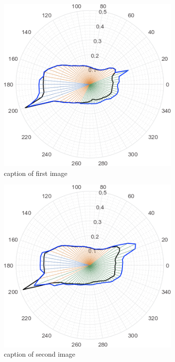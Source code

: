 \begin{figure}
     \centering
    \begin{subfigure}[t]{0.49\textwidth}
     \centering
        \includegraphics[width=0.8\linewidth]{STYLESTUFF/round00.png}
        \caption{caption of first image}
    \end{subfigure}
    \begin{subfigure}[t]{0.49\textwidth}
     \centering
       \includegraphics[width=0.8\linewidth]{STYLESTUFF/round01.png}
        \caption{caption of second image}
    \end{subfigure}
    \par\bigskip
   \begin{subfigure}[t]{0.49\textwidth}

\end{subfigure}
\end{figure}
